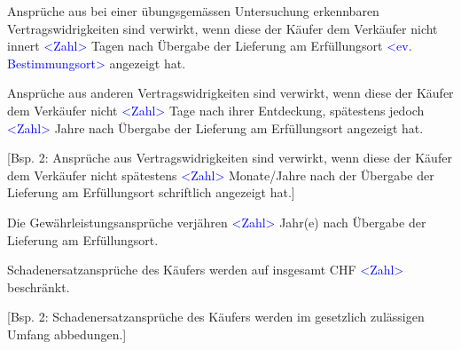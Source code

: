 \documentclass[parskip=half]{scrreprt}
\begin{document}
\begin{contract}
\parnumbertrue


Ansprüche aus bei einer übungsgemässen Untersuchung erkennbaren Vertragswidrigkeiten sind verwirkt, wenn diese der Käufer dem Verkäufer nicht innert \textcolor{blue}{<Zahl>} Tagen nach Übergabe der Lieferung am Erfüllungsort \textcolor{blue}{<ev. Bestimmungsort>} angezeigt hat.

Ansprüche aus anderen Vertragswidrigkeiten sind verwirkt, wenn diese der Käufer dem Verkäufer nicht \textcolor{blue}{<Zahl>} Tage nach ihrer Entdeckung, spätestens jedoch \textcolor{blue}{<Zahl>} Jahre nach Übergabe der Lieferung am Erfüllungsort angezeigt hat.


[Bsp. 2: Ansprüche aus Vertragswidrigkeiten sind verwirkt, wenn diese der Käufer dem Verkäufer nicht spätestens \textcolor{blue}{<Zahl>} Monate/Jahre nach der Übergabe der Lieferung am Erfüllungsort schriftlich angezeigt hat.]
\parnumbertrue


Die Gewährleistungsansprüche verjähren \textcolor{blue}{<Zahl>} Jahr(e) nach Übergabe der Lieferung am Erfüllungsort.

\parnumbertrue




Schadenersatzansprüche des Käufers werden auf insgesamt CHF \textcolor{blue}{<Zahl>} beschränkt.


[Bsp. 2: Schadenersatzansprüche des Käufers werden im gesetzlich zulässigen Umfang abbedungen.]
\parnumbertrue


\end{contract}
\end{document}
